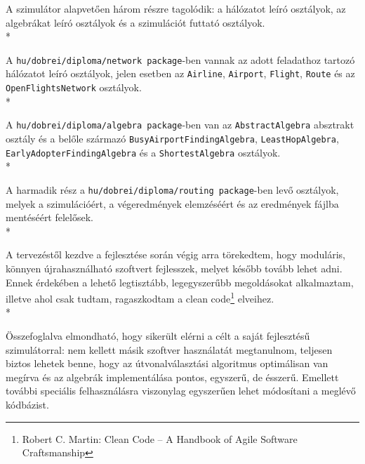   A szimulátor alapvetően három részre tagolódik: a hálózatot leíró osztályok, az algebrákat leíró osztályok és a szimulációt futtató osztályok.\\*

  A \texttt{hu/dobrei/diploma/network package}-ben vannak az adott feladathoz tartozó hálózatot leíró osztályok, jelen esetben az \texttt{Airline}, \texttt{Airport}, \texttt{Flight}, \texttt{Route} és az \texttt{OpenFlightsNetwork} osztályok.\\*

  A \texttt{hu/dobrei/diploma/algebra package}-ben van az \texttt{AbstractAlgebra} absztrakt osztály és a belőle származó \texttt{BusyAirportFindingAlgebra}, \texttt{LeastHopAlgebra}, \texttt{EarlyAdopterFindingAlgebra} és a \texttt{ShortestAlgebra} osztályok.\\*

  A harmadik rész a \texttt{hu/dobrei/diploma/routing package}-ben levő osztályok, melyek a szimulációért, a végeredmények elemzéséért és az eredmények fájlba mentéséért felelősek.\\*

  A tervezéstől kezdve a fejlesztése során végig arra törekedtem, hogy moduláris, könnyen újrahasználható szoftvert fejlesszek, melyet később tovább lehet adni. Ennek érdekében a lehető legtisztább, legegyszerűbb megoldásokat alkalmaztam, illetve ahol csak tudtam, ragaszkodtam a clean code\footnote{Robert C. Martin: Clean Code -- A Handbook of Agile Software Craftsmanship} elveihez.\\*

  Összefoglalva elmondható, hogy sikerült elérni a célt a saját fejlesztésű szimulátorral: nem kellett másik szoftver használatát megtanulnom, teljesen biztos lehetek benne, hogy az útvonalválasztási algoritmus optimálisan van megírva és az algebrák implementálása pontos, egyszerű, de ésszerű. Emellett további speciális felhasználásra viszonylag egyszerűen lehet módosítani a meglévő kódbázist.
